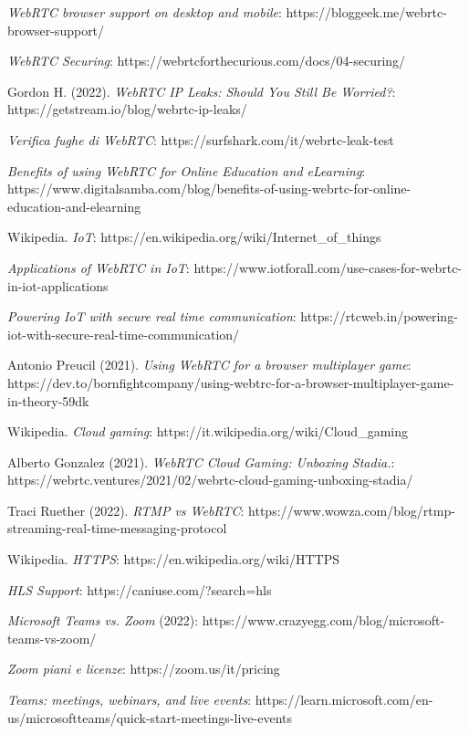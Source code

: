 \documentclass[11pt, a4paper, openany]{book}
\begin{document}
\begin{thebibliography}{9}
 		\emph{WebRTC browser support on desktop and mobile}: https://bloggeek.me/webrtc-browser-support/
 		
 		\emph{WebRTC Securing}: https://webrtcforthecurious.com/docs/04-securing/
 		
 		Gordon H. (2022). \emph{WebRTC IP Leaks: Should You Still Be Worried?}: https://getstream.io/blog/webrtc-ip-leaks/
 		
 		\emph{Verifica fughe di WebRTC}: https://surfshark.com/it/webrtc-leak-test
 		
 		\emph{Benefits of using WebRTC for Online Education and eLearning}: https://www.digitalsamba.com/blog/benefits-of-using-webrtc-for-online-education-and-elearning
 		
 		Wikipedia. \emph{IoT}: https://en.wikipedia.org/wiki/Internet\_of\_things
 		
 		\emph{Applications of WebRTC in IoT}: https://www.iotforall.com/use-cases-for-webrtc-in-iot-applications
 		
 		\emph{Powering IoT with secure real time communication}: https://rtcweb.in/powering-iot-with-secure-real-time-communication/
 		
 		Antonio Preucil (2021). \emph{Using WebRTC for a browser multiplayer game}: https://dev.to/bornfightcompany/using-webtrc-for-a-browser-multiplayer-game-in-theory-59dk
 		
 		Wikipedia. \emph{Cloud gaming}: https://it.wikipedia.org/wiki/Cloud\_gaming
 		
 		Alberto Gonzalez (2021). \emph{WebRTC Cloud Gaming: Unboxing Stadia.}: https://webrtc.ventures/2021/02/webrtc-cloud-gaming-unboxing-stadia/
 		
 		Traci Ruether (2022). \emph{RTMP vs WebRTC}: https://www.wowza.com/blog/rtmp-streaming-real-time-messaging-protocol
 		
 		Wikipedia. \emph{HTTPS}: https://en.wikipedia.org/wiki/HTTPS
 		
 		\emph{HLS Support}: https://caniuse.com/?search=hls
 		
 		\emph{Microsoft Teams vs. Zoom} (2022): https://www.crazyegg.com/blog/microsoft-teams-vs-zoom/
 		
 		\emph{Zoom piani e licenze}: https://zoom.us/it/pricing
 		
 		\emph{Teams: meetings, webinars, and live events}: https://learn.microsoft.com/en-us/microsoftteams/quick-start-meetings-live-events
 		

\end{thebibliography}
\end{document}
